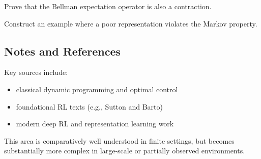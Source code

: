 \begin{exercise}
Prove that the Bellman expectation operator is also a contraction.
\end{exercise}

\begin{exercise}
Construct an example where a poor representation violates the Markov property.
\end{exercise}

\subsection{Notes and References}

Key sources include:
\begin{itemize}
\item classical dynamic programming and optimal control
\item foundational RL texts (e.g., Sutton and Barto)
\item modern deep RL and representation learning work
\end{itemize}

This area is comparatively well understood in finite settings, but becomes substantially more complex in large-scale or partially observed environments.
